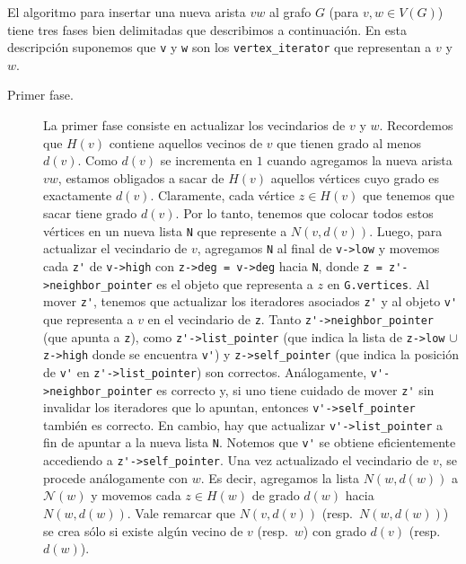 \documentclass[%
    a4paper,%
    fontsize=12pt,%
    DIV=12,
    twoside,%
    openright,%
    titlepage=true,%
    headsepline,%
    toc=bibliography,%
    parskip=half,%
    cleardoublepage=empty,%
    headings=big,%
]{scrbook}
\makeatletter
\newcommand{\Code}[1]{\lstinline[basicstyle={\ttfamily}]@#1@}
\newcommand{\N}{\mathcal{N}}
\makeatother
\begin{document}
El algoritmo para insertar una nueva arista $vw$ al grafo $G$ (para $v, w \in V(G)$) tiene tres fases bien delimitadas que describimos a continuación.  En esta descripción suponemos que \Code{v} y \Code{w} son los \Code{vertex_iterator} que representan a $v$ y $w$.
\begin{description}
\item [Primer fase.] La primer fase consiste en actualizar los vecindarios de $v$ y $w$.  Recordemos que $H(v)$ contiene aquellos vecinos de $v$ que tienen grado al menos $d(v)$.  Como $d(v)$ se incrementa en $1$ cuando agregamos la nueva arista $vw$, estamos obligados a sacar de $H(v)$ aquellos vértices cuyo grado es exactamente $d(v)$.  Claramente, cada vértice $z \in H(v)$ que tenemos que sacar tiene grado $d(v)$.  Por lo tanto, tenemos que colocar todos estos vértices en un nueva lista \Code{N} que represente a $N(v, d(v))$.  Luego, para actualizar el vecindario de $v$, agregamos \Code{N} al final de \Code{v->low} y movemos cada \Code{z'} de \Code{v->high} con \Code{z->deg = v->deg} hacia \Code{N}, donde \Code{z = z'->neighbor_pointer} es el objeto que representa a $z$ en \Code{G.vertices}. Al mover \Code{z'}, tenemos que actualizar los iteradores asociados \Code{z'} y al objeto \Code{v'} que representa a $v$ en el vecindario de \Code{z}.  Tanto \Code{z'->neighbor_pointer} (que apunta a \Code{z}), como \Code{z'->list_pointer} (que indica la lista de \Code{z->low} $\cup$ \Code{z->high} donde se encuentra \Code{v'}) y \Code{z->self_pointer} (que indica la posición de \Code{v'} en \Code{z'->list_pointer}) son correctos.  Análogamente, \Code{v'->neighbor_pointer} es correcto y, si uno tiene cuidado de mover \Code{z'} sin invalidar los iteradores que lo apuntan, entonces \Code{v'->self_pointer} también es correcto.  En cambio, hay que actualizar \Code{v'->list_pointer} a fin de apuntar a la nueva lista \Code{N}.  Notemos que \Code{v'} se obtiene eficientemente accediendo a \Code{z'->self_pointer}.  Una vez actualizado el vecindario de $v$, se procede análogamente con $w$.  Es decir, agregamos la lista $N(w, d(w))$ a $\N(w)$ y movemos cada $z \in H(w)$ de grado $d(w)$ hacia $N(w, d(w))$.  Vale remarcar que $N(v,d(v))$ (resp.\ $N(w, d(w))$) se crea sólo si existe algún vecino de $v$ (resp.\ $w$) con grado $d(v)$ (resp.\ $d(w)$).  


\end{description}
\end{document}
